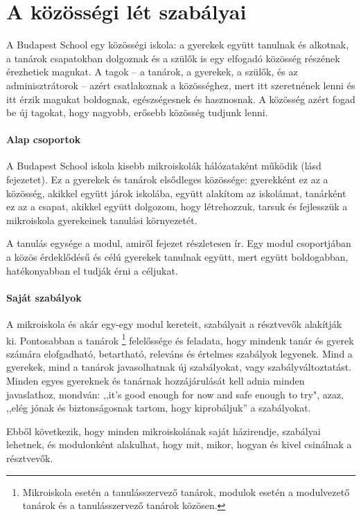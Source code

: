 \section{A közösségi lét szabályai}
\label{sec:kozossegi_elet}
A Budapest School egy közösségi iskola: a gyerekek együtt tanulnak és alkotnak, a tanárok csapatokban dolgoznak és a szülők is egy elfogadó közösség részének érezhetiek magukat. A tagok -- a tanárok, a gyerekek, a szülők, és az adminisztrátorok -- azért csatlakoznak a közösséghez, mert itt szeretnének lenni és itt érzik magukat boldognak, egészségesnek és hasznosnak. A közösség azért fogad be új tagokat, hogy nagyobb, erősebb közösség tudjunk lenni.

\paragraph{Alap csoportok} A Budapest School iskola kisebb mikroiskolák
hálózataként működik (lásd  fejezetet). Ez a gyerekek és tanárok elsődleges közössége: gyerekként ez az a közösség, akikkel együtt járok iskolába, együtt alakítom az iskolámat, tanárként ez az a csapat, akikkel együtt dolgozom, hogy létrehozzuk, tarsuk és fejlesszük a mikroiskola gyerekeinek tanulási környezetét.

A tanulás egysége a modul, amiről  fejezet részletesen ír. Egy modul csoportjában a közös érdeklődésű és célú gyerekek tanulnak együtt, mert együtt boldogabban, hatékonyabban el tudják érni a céljukat.

\paragraph{Saját szabályok}
\label{sec:sajat_szabalyok}
A mikroiskola és akár egy-egy modul kereteit, szabályait a résztvevők alakítják ki. Pontosabban a tanárok \footnote{Mikroiskola esetén a tanulásszervező tanárok, modulok esetén a modulvezető tanárok és a tanulásszervező tanárok közösen.} felelőssége és feladata, hogy mindenk tanár és gyerek számára elofgadható, betartható, releváns és értelmes szabályok legyenek. Mind a gyerekek, mind a tanárok javasolhatnak új szabályokat, vagy szabályváltoztatást. Minden egyes gyereknek és tanárnak hozzájárulását kell adnia minden javaslathoz, mondván: ,,it's good enough for now and safe enough to try", azaz, ,,elég jónak és biztonságosnak tartom, hogy kiprobáljuk'' a szabályokat.

Ebből következik, hogy minden mikroiskolának saját házirendje, szabályai lehetnek, és modulonként alakulhat, hogy mit, mikor, hogyan és kivel csinálnak a résztvevők.

